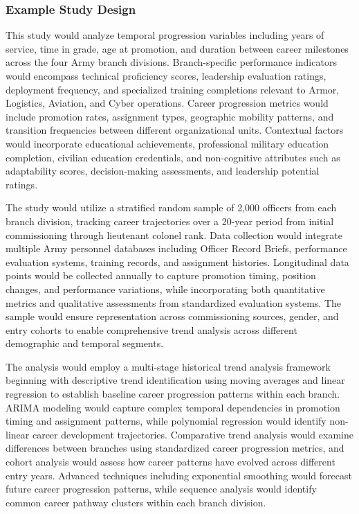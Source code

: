\documentclass[../main.tex]{subfiles}
\begin{document}
\subsubsection{Example Study Design}


This study would analyze temporal progression variables including years of service, time in grade, age at promotion, and duration between career milestones across the four Army branch divisions. Branch-specific performance indicators would encompass technical proficiency scores, leadership evaluation ratings, deployment frequency, and specialized training completions relevant to Armor, Logistics, Aviation, and Cyber operations. Career progression metrics would include promotion rates, assignment types, geographic mobility patterns, and transition frequencies between different organizational units. Contextual factors would incorporate educational achievements, professional military education completion, civilian education credentials, and non-cognitive attributes such as adaptability scores, decision-making assessments, and leadership potential ratings.


The study would utilize a stratified random sample of 2,000 officers from each branch division, tracking career trajectories over a 20-year period from initial commissioning through lieutenant colonel rank. Data collection would integrate multiple Army personnel databases including Officer Record Briefs, performance evaluation systems, training records, and assignment histories. Longitudinal data points would be collected annually to capture promotion timing, position changes, and performance variations, while incorporating both quantitative metrics and qualitative assessments from standardized evaluation systems. The sample would ensure representation across commissioning sources, gender, and entry cohorts to enable comprehensive trend analysis across different demographic and temporal segments.


The analysis would employ a multi-stage historical trend analysis framework beginning with descriptive trend identification using moving averages and linear regression to establish baseline career progression patterns within each branch. ARIMA modeling would capture complex temporal dependencies in promotion timing and assignment patterns, while polynomial regression would identify non-linear career development trajectories. Comparative trend analysis would examine differences between branches using standardized career progression metrics, and cohort analysis would assess how career patterns have evolved across different entry years. Advanced techniques including exponential smoothing would forecast future career progression patterns, while sequence analysis would identify common career pathway clusters within each branch division.
\end{document}
